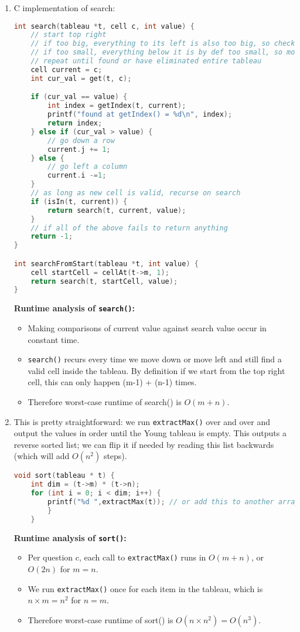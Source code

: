\documentclass{article}
\begin{document}
\begin{enumerate}
\begin{enumerate}
	\item C implementation of search:
	
	\begin{lstlisting}[language=C, style=CStyle]
int search(tableau *t, cell c, int value) {
	// start top right
	// if too big, everything to its left is also too big, so check the next row
	// if too small, everything below it is by def too small, so move left
	// repeat until found or have eliminated entire tableau
	cell current = c;
	int cur_val = get(t, c);

	if (cur_val == value) {
		int index = getIndex(t, current);
		printf("found at getIndex() = %d\n", index);
		return index;
	} else if (cur_val > value) {
		// go down a row
		current.j += 1;
	} else {
		// go left a column
		current.i -=1;
	}
	// as long as new cell is valid, recurse on search
	if (isIn(t, current)) {
		return search(t, current, value);
	}
	// if all of the above fails to return anything
	return -1;
}

int searchFromStart(tableau *t, int value) {
	cell startCell = cellAt(t->m, 1);
	return search(t, startCell, value);
}	\end{lstlisting}

\textbf{Runtime analysis of \texttt{search()}:}
	\begin{itemize}
		\item Making comparisons of current value against search value occur in constant time.
	\item \texttt{search()} recurs every time we move down or move left and still find a valid cell inside the tableau. By definition if we start from the top right cell, this can only happen (m-1) + (n-1) times.
	\item Therefore worst-case runtime of search() is $O(m+n)$.
	\end{itemize}
	
	\item This is pretty straightforward: we run \texttt{extractMax()} over and over and output the values in order until the Young tableau is empty. This outputs a reverse sorted list; we can flip it if needed by reading this list backwards (which will add $O(n^2)$ steps).
	
	\begin{lstlisting}[language=C, style=CStyle]
	void sort(tableau * t) {
	int dim = (t->m) * (t->n); 
	for (int i = 0; i < dim; i++) {
		printf("%d ",extractMax(t)); // or add this to another array etc
		}
	}
	\end{lstlisting}
	\textbf{Runtime analysis of \texttt{sort()}:}
	\begin{itemize}
		\item Per question c, each call to \texttt{extractMax()} runs in $O(m+n)$, or $O(2n)$ for $m=n$.
		\item We run \texttt{extractMax()} once for each item in the tableau, which is $n \times m = n^2$ for $n=m$.
	\item Therefore worst-case runtime of sort() is $O(n \times n^2) = O(n^3)$.
	\end{itemize}
	

\end{enumerate}
\end{enumerate}
\end{document}
